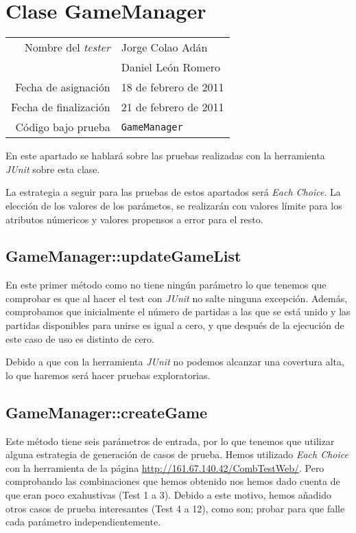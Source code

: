 \section{Clase GameManager}

{\small
\begin{tabular}{r|l}
Nombre del \textit{tester} & Jorge Colao Adán \\
& Daniel León Romero\\
Fecha de asignación & 18 de febrero de 2011 \\
Fecha de finalización & 21 de febrero de 2011 \\
Código bajo prueba & \texttt{GameManager}
\end{tabular}
}

En este apartado se hablará sobre las pruebas realizadas con la herramienta \textit{JUnit} sobre esta clase.

La estrategia a seguir para las pruebas de estos apartados será \textit{Each Choice}. La elección de los valores de los parámetos, se realizarán con valores límite para los atributos númericos y valores propensos a error para el resto.

\subsection{GameManager::updateGameList}

En este primer método como no tiene ningún parámetro lo que tenemos que comprobar es que al hacer el test con \textit{JUnit} no salte ninguna excepción. Además, comprobamos que inicialmente el número de partidas a las que se está unido y las partidas disponibles para unirse es igual a cero, y que después de la ejecución de este caso de uso es distinto de cero.

Debido a que con la herramienta \textit{JUnit} no podemos alcanzar una covertura alta, lo que haremos será hacer pruebas exploratorias.

\subsection{GameManager::createGame}

Este método tiene seis parámetros de entrada, por lo que tenemos que utilizar alguna estrategia de generación de casos de prueba. Hemos utilizado \textit{Each Choice} con la herramienta de la página \url{http://161.67.140.42/CombTestWeb/}. Pero comprobando las combinaciones que hemos obtenido nos hemos dado cuenta de que eran poco exahustivas (Test 1 a 3). Debido a este motivo, hemos añadido otros casos de prueba interesantes (Test 4 a 12), como son; probar para que falle cada parámetro independientemente.


